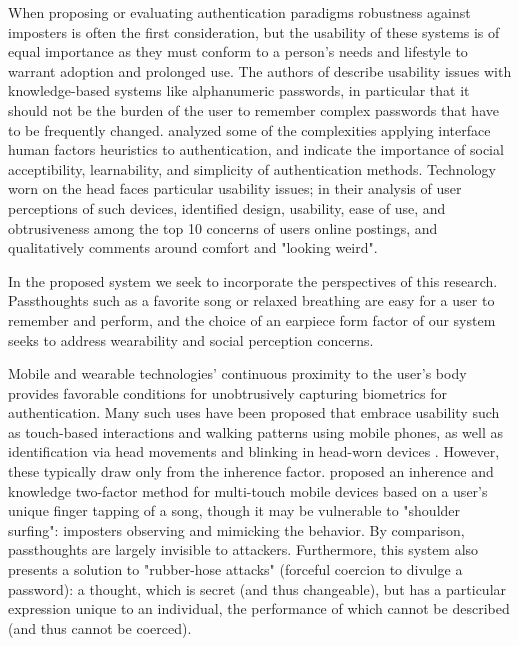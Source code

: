 \documentclass{sigchi}
\begin{document}
When proposing or evaluating authentication paradigms robustness against imposters is often the first consideration, but the usability of these systems is of equal importance as they must conform to a person's needs and lifestyle to warrant adoption and prolonged use. The authors of \cite{sasse2001} describe usability issues with knowledge-based systems like alphanumeric passwords, in particular that it should not be the burden of the user to remember complex passwords that have to be frequently changed. \cite{braz2006} analyzed some of the complexities applying interface human factors heuristics to authentication, and indicate the importance of social acceptibility, learnability, and simplicity of authentication methods. Technology worn on the head faces particular usability issues; in their analysis of user perceptions of such devices, \cite{Genaro2014} identified design, usability, ease of use, and obtrusiveness among the top 10 concerns of users online postings, and qualitatively comments around comfort and "looking weird".

In the proposed system we seek to incorporate the perspectives of this research. Passthoughts such as a favorite song or relaxed breathing are easy for a user to remember and perform, and the choice of an earpiece form factor of our system seeks to address wearability and social perception concerns.

Mobile and wearable technologies' continuous proximity to the user's body provides favorable conditions for unobtrusively capturing biometrics for authentication. Many such uses have been proposed that embrace usability such as touch-based interactions \cite{Tartz2015, Holz2015} and walking patterns \cite{Lu2014} using mobile phones, as well as identification via head movements and blinking in head-worn devices \cite{Rogers2015}. However, these typically draw only from the inherence factor. \cite{Chen2015} proposed an inherence and knowledge two-factor method for multi-touch mobile devices based on a user's unique finger tapping of a song, though it may be vulnerable to "shoulder surfing": imposters observing and mimicking the behavior. By comparison, passthoughts are largely invisible to attackers. Furthermore, this system also presents a solution to "rubber-hose attacks" (forceful coercion to divulge a password): a thought, which is secret (and thus changeable), but has a particular expression unique to an individual, the performance of which cannot be described (and thus cannot be coerced).

\end{document}
